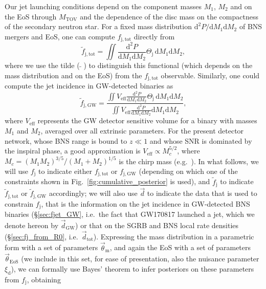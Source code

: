 \documentclass[]{aa}
\newcommand{\resp}[1]{#1}
\begin{document}
Our jet launching conditions depend on the component masses $M_1$, $M_2$ and on the EoS through $M_\mathrm{TOV}$ and the dependence of the disc mass on the \resp{compactness of the secondary} neutron star. \resp{For a fixed} mass distribution $\mathrm{d}^2P/\mathrm{d}M_1\mathrm{d}M_2$ of BNS mergers and EoS, \resp{one can compute} $f_\mathrm{j,tot}$ directly from
\begin{equation}
 \tilde f_\mathrm{j,tot} = \iint\frac{\mathrm{d}^2P}{\mathrm{d}M_1\mathrm{d}M_2} \Theta_\mathrm{j}\,\mathrm{d}M_1\mathrm{d}M_2,
\end{equation}
where we use the tilde ($\,\tilde ~\,$) to distinguish this functional (which depends on the mass distribution and on the EoS) from the $f_\mathrm{j,tot}$ \resp{observable}. Similarly, \resp{one} could compute the jet \resp{incidence} in GW-detected binaries as
\begin{equation}
 \tilde f_\mathrm{j,GW} = \frac{\iint V_\mathrm{eff}\frac{\mathrm{d}^2P}{\mathrm{d}M_1\mathrm{d}M_2}\Theta_\mathrm{j}\,\mathrm{d}M_1\mathrm{d}M_2}{\iint V_\mathrm{eff}\frac{\mathrm{d}^2P}{\mathrm{d}M_1\mathrm{d}M_2}\mathrm{d}M_1\mathrm{d}M_2},
 \label{eq:ftildejGW}
\end{equation}
where $V_\mathrm{eff}$ represents the GW detector sensitive volume for a binary with masses $M_1$ and $M_2$, averaged over all extrinsic parameters. For the present detector network, whose BNS range is bound to $z\ll 1$ and whose SNR is dominated by the inspiral phase, a good approximation is $V_\mathrm{eff}\propto M_c^{5/2}$, where $M_c=(M_1M_2)^{3/5}/(M_1+M_2)^{1/5}$ is the chirp mass (e.g.~\citealt{Mandel2019}). In what follows, we will use $f_\mathrm{j}$ to indicate either $f_\mathrm{j,tot}$ or $f_\mathrm{j,GW}$ (depending on which one of the constraints shown in Fig.~\ref{fig:cumulative_posterior} is used), and $\tilde f_\mathrm{j}$ to indicate $\tilde f_\mathrm{j,tot}$ or $\tilde f_\mathrm{j,GW}$ accordingly; we will also use $\vec d$ to indicate the data that is used to constrain $f_\mathrm{j}$, that is the information on the jet \resp{incidence} in GW-detected BNS binaries \resp{(\S\ref{sec:fjet_GW}, i.e.\ the fact that GW170817 launched a jet, \resp{which we denote hereon by $\vec d_\mathrm{GW}$})} or that on the SGRB and BNS local rate densities \resp{(\S\ref{sec:fj_from_R0}, i.e.\ $\vec d_\mathrm{tot}$)}.  Expressing the mass distribution in a parametric form with a set of parameters $\vec \theta_\mathrm{m}$, and again the EoS with a set of parameters $\vec \theta_\mathrm{EoS}$ \resp{(we include in this set, for ease of presentation, also the nuisance parameter $\xi_\mathrm{d}$)}, we can formally use Bayes' theorem to infer posteriors on these parameters from $f_\mathrm{j}$, obtaining
\end{document}

